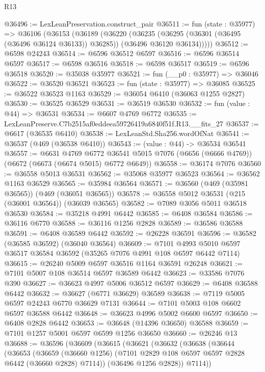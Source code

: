 \begin{lexlean}{R13}
\begin{coremodule}
@36496 := LexLeanPreservation.construct_pair
@36511 := fun (state : @35977) =>
  @36106
    (@36153
      (@36189
        (@36220
          (@36235
            (@36295 (@36301 (@36495 (@36496 @36124 @36133)) @36285))
            (@36496 @36120 @36134)))))
@36512 := @6598 @24243
@36514 := @6596 @36512 @6597
@36516 := @6596 @36514 @6597
@36517 := @6598 @36516
@36518 := @6598 @36517
@36519 := @6596 @36518
@36520 := @35038 @35977
@36521 := fun (__p0 : @35977) => @36046
@36522 := @36520 @36521
@36523 := fun (state : @35977) => @36085
@36525 := @36522 @36523 @1163
@36529 := @36054 @6410 (@36063 @1255 @2827)
@36530 := @36525 @36529
@36531 := @36519 @36530
@36532 := fun (value : @44) => @36531
@36534 := @6607 @4769 @6772
@36535 := LexLeanPreserve.C7b2515af0eddeea59726419a6840f51f.R13.__fits_27
@36537 := @6617 (@36535 @6410)
@36538 := LexLeanStd.Sha256.wordOfNat
@36541 := @36537 (@469 (@36538 @6410))
@36543 := (value : @44) -> @36534 @36541
@36557 := @6631
    @4769
    @6772
    @36541
    @5015
    @7076
    (@6656 (@6666 @4769))
    (@6672 (@6673 (@6674 @5015) @6772 @6649))
@36558 := @36174 @7076
@36560 := @36558 @5013 @36531
@36562 := @35068 @35977 @36523
@36564 := @36562 @1163 @36529
@36565 := @35984 @36564
@36571 := @36560 (@469 (@35981 @36565)) (@469 (@36051 @36565))
@36578 := @36558 @5012 @36531 (@215 (@36001 @36564)) (@36039 @36565)
@36582 := @7089 @3056 @5011 @36518 @36530
@36584 := @35218 @4991 @6442
@36585 := @6408 @36584
@36586 := @36116 @6770
@36588 := @36116 @1256 @2828
@36589 := @36586 @36588
@36591 := @6408 @36589 @6442
@36592 := @26228 @36591
@36596 := @36582 (@36585 @36592) (@36040 @36564)
@36609 := @7101 @4993 @5010 @6597 @36517 @36584 @36592 (@35265 @7076 @4991 @108 @6597 @6442 @7114)
@36615 := @26240 @5009 @6597 @36516 @1164 @36591 @26248
@36621 := @7101 @5007 @108 @36514 @6597 @36589 @6442
@36623 := @33586 @7076 @390
@36627 := @36623 @4997 @5006 @36512 @6597
@36629 := @6408 @36588 @6442
@36632 := @36627 (@6771 @36629) @36589
@36638 := @7119 @5005 @6597 @24243 @6770 @36629 @7131
@36644 := @7101 @5003 @108 @6602 @6597 @36588 @6442
@36648 := @36623 @4996 @5002 @6600 @6597
@36650 := @6408 @2828 @6442
@36653 := @36648 (@14396 @36650) @36588
@36659 := @7101 @1257 @5001 @6597 @6599 @1256 @36650
@36660 := @26246 @13
@36688 := @36596
    (@36609
      (@36615
        (@36621
          (@36632
            (@36638
              (@36644
                (@36653
                  (@36659
                    (@36660 @1256)
                    (@7101 @2829 @108 @6597 @6597 @2828 @6442 (@36660 @2828) @7114))
                  (@36496 @1256 @2828))
                @7114))

\end{coremodule}
\end{lexlean}
